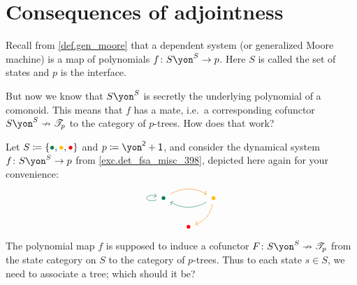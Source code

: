 \documentclass[Book-Poly]{subfiles}
\begin{document}
\section{Consequences of adjointness}


Recall from \cref{def.gen_moore} that a dependent system (or generalized Moore machine) is a map of polynomials $f\colon S\yon^S\to p$. Here $S$ is called the set of states and $p$ is the interface. 

But now we know that $S\yon^S$ is secretly the underlying polynomial of a comonoid. This means that $f$ has a mate, i.e.\ a corresponding cofunctor $S\yon^S\cof\cofree{p}$ to the category of $p$-trees. How does that work?

\begin{example}\label{ex.cofree_dyn_sys}
Let $S\coloneqq\{\bul[dgreen],\bul[dyellow],\bul[red]\}$ and $p\coloneqq\yon^\2+\1$, and consider the dynamical system $f\colon S\yon^S\to p$ from \cref{exc.det_fsa_misc_398}, depicted here again for your convenience:
\[
\begin{tikzcd}[column sep=small]
	\bul[dgreen]\ar[rr, bend left, orange]\ar[loop left, dgreen]&&
	\bul[dyellow]\ar[dl, bend left, orange]\ar[ll, dgreen, bend left]\\&
	\bul[red]
\end{tikzcd}
\]
The polynomial map $f$ is supposed to induce a cofunctor $F\colon S\yon^S\cof\cofree{p}$ from the state category on $S$ to the category of $p$-trees. Thus to each state $s\in S$, we need to associate a tree; which should it be? 
\end{example}
\end{document}
